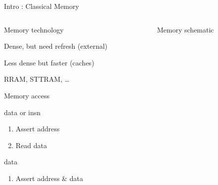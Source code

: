 %
\begin{Frame}{Intro : Classical Memory}
  \begin{columns}[t]
    \begin{column}{\BW} %
      \begin{block}{Memory technology}
        \begin{description}[DRAM]
        \item[\href{https://en.wikipedia.org/wiki/Dynamic_random-access_memory}{DRAM}]
          Dense, but need refresh (external)
        \item[\href{https://en.wikipedia.org/wiki/Static_random-access_memory}{SRAM}]
          Less dense but faster (caches)
        \item[Other] RRAM, STTRAM, \ldots
        \end{description}
      \end{block} 
      \begin{block}{Memory access}
        \begin{description}[LOAD]
        \item[LOAD] data or insn
          \begin{enumerate}
          \item Assert address
          \item Read data
          \end{enumerate}
        \item[STORE] data
          \begin{enumerate}
          \item Assert address \& data
          \end{enumerate}
        \end{description}
      \end{block} 
    \end{column}
    
    \begin{column}{\BW} %
      \begin{block}{Memory schematic}
      \end{block}   
    \end{column}
  \end{columns}  
\end{Frame}


